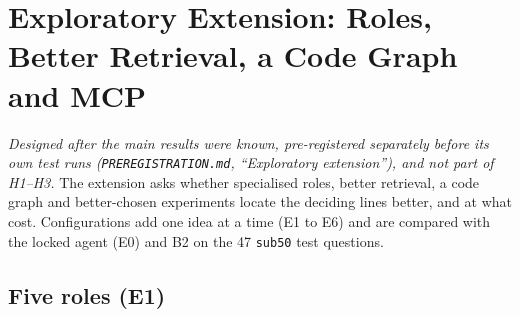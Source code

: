\documentclass[10pt,a4paper]{article}
\newcommand{\code}[1]{\texttt{\small #1}}
\begin{document}
\section{Exploratory Extension: Roles, Better Retrieval, a Code Graph and MCP}

\emph{Designed after the main results were known, pre-registered separately before its own test runs
(\code{PREREGISTRATION.md}, ``Exploratory extension''), and not part of H1--H3.} The extension asks whether specialised roles, better retrieval, a code graph and better-chosen
experiments locate the deciding lines better, and at what cost. Configurations add one idea at a time (E1 to E6) and
are compared with the locked agent (E0) and B2 on the 47 \code{sub50} test questions.

\subsection{Five roles (E1)}
\end{document}
